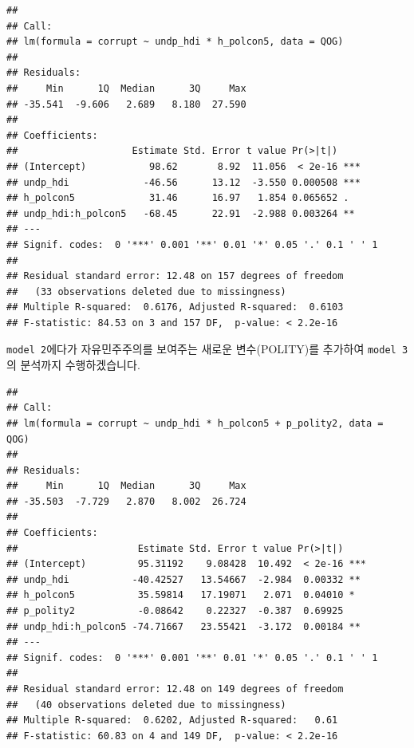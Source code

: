 \documentclass[]{book}
\newenvironment{Shaded}{\begin{snugshade}}{\end{snugshade}}
\newcommand{\DataTypeTok}[1]{\textcolor[rgb]{0.13,0.29,0.53}{#1}}
\newcommand{\KeywordTok}[1]{\textcolor[rgb]{0.13,0.29,0.53}{\textbf{#1}}}
\newcommand{\NormalTok}[1]{#1}
\newcommand{\OperatorTok}[1]{\textcolor[rgb]{0.81,0.36,0.00}{\textbf{#1}}}
\newcommand{\StringTok}[1]{\textcolor[rgb]{0.31,0.60,0.02}{#1}}
\begin{document}
\begin{verbatim}
## 
## Call:
## lm(formula = corrupt ~ undp_hdi * h_polcon5, data = QOG)
## 
## Residuals:
##     Min      1Q  Median      3Q     Max 
## -35.541  -9.606   2.689   8.180  27.590 
## 
## Coefficients:
##                    Estimate Std. Error t value Pr(>|t|)    
## (Intercept)           98.62       8.92  11.056  < 2e-16 ***
## undp_hdi             -46.56      13.12  -3.550 0.000508 ***
## h_polcon5             31.46      16.97   1.854 0.065652 .  
## undp_hdi:h_polcon5   -68.45      22.91  -2.988 0.003264 ** 
## ---
## Signif. codes:  0 '***' 0.001 '**' 0.01 '*' 0.05 '.' 0.1 ' ' 1
## 
## Residual standard error: 12.48 on 157 degrees of freedom
##   (33 observations deleted due to missingness)
## Multiple R-squared:  0.6176, Adjusted R-squared:  0.6103 
## F-statistic: 84.53 on 3 and 157 DF,  p-value: < 2.2e-16
\end{verbatim}

\texttt{model\ 2}에다가 자유민주주의를 보여주는 새로운 변수(POLITY)를 추가하여 \texttt{model\ 3}의 분석까지 수행하겠습니다.

\begin{Shaded}
\end{Shaded}

\begin{verbatim}
## 
## Call:
## lm(formula = corrupt ~ undp_hdi * h_polcon5 + p_polity2, data = QOG)
## 
## Residuals:
##     Min      1Q  Median      3Q     Max 
## -35.503  -7.729   2.870   8.002  26.724 
## 
## Coefficients:
##                     Estimate Std. Error t value Pr(>|t|)    
## (Intercept)         95.31192    9.08428  10.492  < 2e-16 ***
## undp_hdi           -40.42527   13.54667  -2.984  0.00332 ** 
## h_polcon5           35.59814   17.19071   2.071  0.04010 *  
## p_polity2           -0.08642    0.22327  -0.387  0.69925    
## undp_hdi:h_polcon5 -74.71667   23.55421  -3.172  0.00184 ** 
## ---
## Signif. codes:  0 '***' 0.001 '**' 0.01 '*' 0.05 '.' 0.1 ' ' 1
## 
## Residual standard error: 12.48 on 149 degrees of freedom
##   (40 observations deleted due to missingness)
## Multiple R-squared:  0.6202, Adjusted R-squared:   0.61 
## F-statistic: 60.83 on 4 and 149 DF,  p-value: < 2.2e-16
\end{verbatim}
\end{document}
